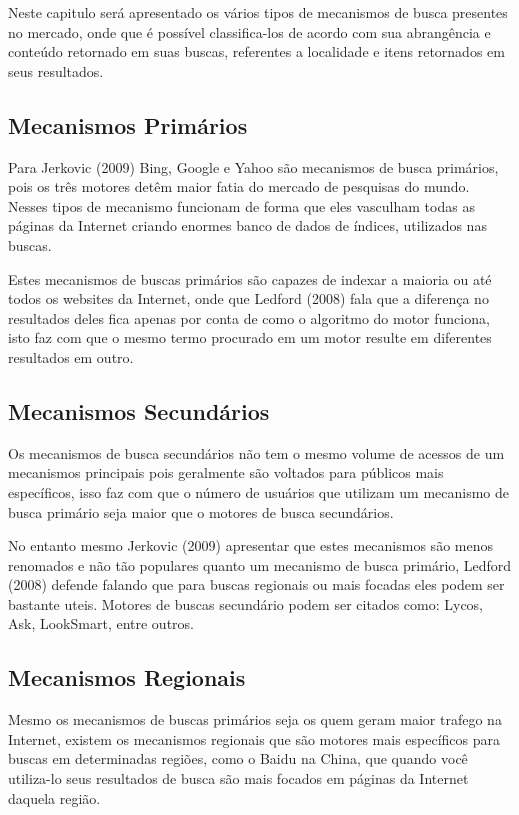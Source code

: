 \documentclass[
	12pt,				%
	openright,			%
	twoside,			%
	a4paper,			%
	english,			%
	french,				%
	spanish,			%
	brazil				%
	]{abntex2}
\begin{document}
Neste capitulo será apresentado os vários tipos de mecanismos de busca presentes no mercado, onde que é possível classifica-los de acordo com sua abrangência e conteúdo retornado em suas buscas, referentes a localidade e itens retornados em seus resultados.

\subsection{Mecanismos Primários}

Para Jerkovic (2009) Bing, Google e Yahoo são mecanismos de busca primários, pois os três motores detêm maior fatia do mercado de pesquisas do mundo. Nesses tipos de mecanismo funcionam de forma que eles vasculham todas as páginas da Internet criando enormes banco de dados de índices, utilizados nas buscas.

Estes mecanismos de buscas primários são capazes de indexar a maioria ou até todos os websites da Internet, onde que Ledford (2008) fala que a diferença no resultados deles fica apenas por conta de como o algoritmo do motor funciona, isto faz com que o mesmo termo procurado em um motor resulte em diferentes resultados em outro.

\subsection{Mecanismos Secundários}

Os mecanismos de busca secundários não tem o mesmo volume de acessos de um mecanismos principais pois geralmente são voltados para públicos mais específicos, isso faz com que o número de usuários que utilizam um mecanismo de busca primário seja maior que o motores de busca secundários.

No entanto mesmo Jerkovic (2009) apresentar que estes mecanismos são menos renomados e não tão populares quanto um mecanismo de busca primário, Ledford (2008) defende falando que para buscas regionais ou mais focadas eles podem ser bastante uteis. Motores de buscas secundário podem ser citados como: Lycos, Ask, LookSmart, entre outros. 

\subsection{Mecanismos Regionais}

Mesmo os mecanismos de buscas primários seja os quem geram maior trafego na Internet, existem os mecanismos regionais que são motores mais específicos para buscas em determinadas regiões, como o Baidu na China, que quando você utiliza-lo seus resultados de busca são mais focados em páginas da Internet daquela região.
\end{document}
